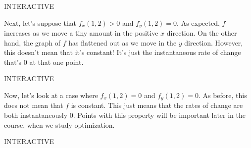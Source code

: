 \documentclass{ximera}
\begin{document}
INTERACTIVE

Next, let's suppose that $f_x(1,2)>0$ and $f_y(1,2) =0$. As expected, $f$ increases as we move a tiny amount in the positive $x$ direction. On the other hand, the graph of $f$ has flattened out as we move in the $y$ direction. However, this doesn't mean that it's constant! It's just the instantaneous rate of change that's $0$ at that one point.

INTERACTIVE

Now, let's look at a case where $f_x(1,2)=0$ and $f_y(1,2)=0$. As before, this does not mean that $f$ is constant. This just means that the rates of change are both instantaneously $0$. Points with this property will be important later in the course, when we study optimization.

INTERACTIVE
\end{document}
